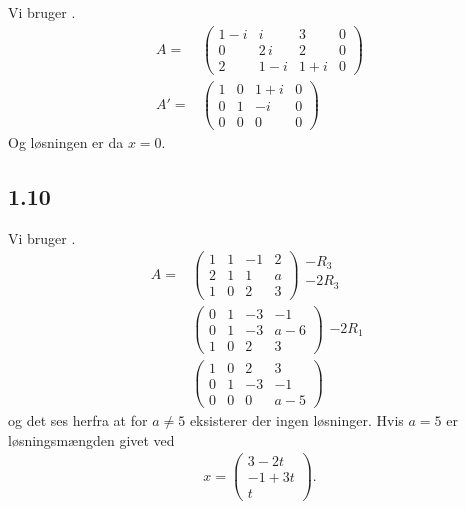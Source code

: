 		Vi bruger \cite[Sætning 1.2.18]{hesselholt2017}.
			\begin{align*}
				A=&\left( \begin {array}{cccc} 1-i&i&3&0\\0&2\,i&2&0 \\ 2&1-i&1+i&0\end {array} \right)\\
				A'=&\left( \begin {array}{cccc} 1 & 0 & 1+i &0 \\0&1& -i &0 \\ 0&0&0&0\end {array} \right)
			\end{align*} 	
		Og løsningen er da $x=0$.

		\subsection{1.10}

		Vi bruger \cite[Sætning 1.2.18]{hesselholt2017}.
			\begin{align*}
				A=&\left(\begin{array}{rrr|r} {1} & {1} & {-1} & {2} \\ {2} & {1} & {1} & {a} \\ {1} & {0} & {2} & {3} \end{array}\right)\begin{array}{c} -R_3 \\ -2R_3 \\ \, \end{array}\\
				&\left(\begin{array}{rrr|r} {0} & {1} & {-3} & {-1} \\ {0} & {1} & {-3} & {a-6} \\ {1} & {0} & {2} & {3} \end{array}\right)\begin{array}{c} \, \\ -2R_1 \\ \, \end{array}\\
				&\left(\begin{array}{rrr|r} {1} & {0} & {2} & {3} \\ {0} & {1} & {-3} & {-1} \\ {0} & {0} & {0} & {a-5} \end{array}\right)
			\end{align*}
		og det ses herfra at for $a\neq 5$ eksisterer der ingen løsninger. Hvis $a=5$ er løsningsmængden givet ved
			\begin{align*}
			  	x =\left(\begin{array}{c} 3-2t \\ -1+3t \\ t \end{array}\right).
			\end{align*}   

